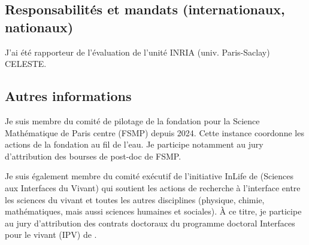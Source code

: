 \subsection{Responsabilités et mandats (internationaux, nationaux)}
% 

J’ai été rapporteur de l'évaluation de l'unité INRIA (univ. Paris-Saclay) CELESTE.

\subsection{Autres informations}
Je suis membre du comité de pilotage de la fondation pour la Science Mathématique de Paris centre (FSMP) depuis 2024. Cette instance coordonne les actions de la fondation au fil de l’eau. Je participe notamment au jury d’attribution des bourses de post-doc de FSMP.

Je suis également membre du comité exécutif de l'initiative InLife de \SU (Sciences aux Interfaces du Vivant) qui soutient les actions de recherche à l’interface entre les sciences du vivant et toutes les autres disciplines (physique, chimie, mathématiques, mais aussi sciences humaines et sociales). À ce titre, je participe au jury d’attribution des contrats doctoraux du programme doctoral Interfaces pour le vivant (IPV) de \SU.
